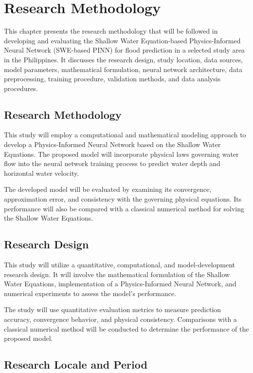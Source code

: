 
\chapter{Research Methodology}

\label{chap:methodology}

This chapter presents the research methodology that will be followed in developing and evaluating the Shallow Water Equation-based Physics-Informed Neural Network (SWE-based PINN) for flood prediction in a selected study area in the Philippines. It discusses the research design, study location, data sources, model parameters, mathematical formulation, neural network architecture, data preprocessing, training procedure, validation methods, and data analysis procedures.

\section{Research Methodology}

This study will employ a computational and mathematical modeling approach to develop a Physics-Informed Neural Network based on the Shallow Water Equations. The proposed model will incorporate physical laws governing water flow into the neural network training process to predict water depth and horizontal water velocity.

The developed model will be evaluated by examining its convergence, approximation error, and consistency with the governing physical equations. Its performance will also be compared with a classical numerical method for solving the Shallow Water Equations.

\section{Research Design}

This study will utilize a quantitative, computational, and model-development research design. It will involve the mathematical formulation of the Shallow Water Equations, implementation of a Physics-Informed Neural Network, and numerical experiments to assess the model's performance.

The study will use quantitative evaluation metrics to measure prediction accuracy, convergence behavior, and physical consistency. Comparisons with a classical numerical method will be conducted to determine the performance of the proposed model.

\section{Research Locale and Period}

